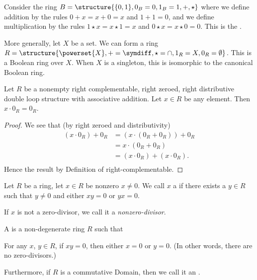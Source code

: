 \begin{example}
Consider the ring $B = \structure{\{0,1\}, 0_{B} = 0, 1_{B} = 1, +, \star}$
where we define addition by the rules $0+x=x+0=x$ and $1+1=0$, and we
define multiplication by the rules $1\star x=x\star 1=x$ and $0\star x=x\star0=0$.
This is the .

More generally, let $X$ be a set. We can form a ring $R=\structure{\powerset{X},+=\symdiff,\star=\cap,1_{R}=X,0_{R}=\emptyset}$.
This is a Boolean ring over $X$. When $X$ is a singleton, this is
isomorphic to the canonical Boolean ring.
\end{example}

\begin{theorem}
Let $R$ be a nonempty right complementable, right zeroed, right
distributive double loop structure with associative addition.
Let $x\in R$ be any element.
Then $x\cdot 0_{R}=0_{R}$.
\end{theorem}

\begin{proof}
We see that (by right zeroed and distributivity)
\begin{equation*}
\begin{aligned}
(x\cdot 0_{R}) + 0_{R} &= (x\cdot(0_{R} + 0_{R})) + 0_{R}\\
&= x\cdot(0_{R} + 0_{R})\\
&= (x\cdot0_{R}) + (x\cdot0_{R}).\\
\end{aligned}
\end{equation*}
Hence the result by Definition of right-complementable.
\end{proof}

\begin{definition}
Let $R$ be a ring, let $x\in R$ be nonzero $x\neq 0$.
We call $x$ a  if there exists a $y\in R$ such
that $y\neq0$ and either $xy=0$ or $yx=0$.

If $x$ is not a zero-divisor, we call it a \emph{nonzero-divisor}.
\end{definition}

\begin{definition}
A  is a non-degenerate ring $R$ such that
\begin{itemize}
 For any $x$, $y\in R$, if $xy=0$,
then either $x=0$ or $y=0$. (In other words, there are no zero-divisors.)
\end{itemize}
Furthermore, if $R$ is a commutative Domain, then we call it an
.
\end{definition}

